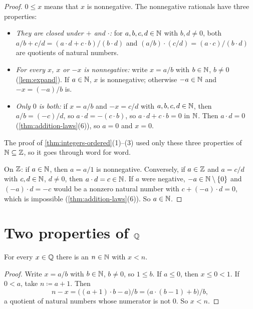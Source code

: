 \begin{proof}
$0 \le x$ means that $x$ is nonnegative. The nonnegative rationals have three
properties:
\begin{itemize}
  \item \emph{They are closed under $+$ and $\cdot$:} for $a, b, c, d \in \mathbb{N}$ with
    $b, d \neq 0$, both $a / b + c / d = (a \cdot d + c \cdot b) / (b \cdot d)$ and
    $(a / b) \cdot (c / d) = (a \cdot c) / (b \cdot d)$ are quotients of natural
    numbers.
  \item \emph{For every $x$, $x$ or $-x$ is nonnegative:} write $x = a / b$ with $b
    \in \mathbb{N}$, $b \neq 0$ (\cref{lem:expand}). If $a \in \mathbb{N}$, $x$ is nonnegative;
    otherwise $-a \in \mathbb{N}$ and $-x = (-a) / b$ is.
  \item \emph{Only $0$ is both:} if $x = a / b$ and $-x = c / d$ with $a, b, c, d
    \in \mathbb{N}$, then $a / b = (-c) / d$, so $a \cdot d = -(c \cdot b)$, so $a \cdot d
    + c \cdot b = 0$ in $\mathbb{N}$. Then $a \cdot d = 0$ (\cref{thm:addition-laws}(6)),
    so $a = 0$ and $x = 0$.
\end{itemize}
The proof of \cref{thm:integers-ordered}(1)--(3) used only these three properties
of $\mathbb{N} \subseteq \mathbb{Z}$, so it goes through word for word.

On $\mathbb{Z}$: if $a \in \mathbb{N}$, then $a = a / 1$ is nonnegative. Conversely, if $a \in \mathbb{Z}$
and $a = c / d$ with $c, d \in \mathbb{N}$, $d \neq 0$, then $a \cdot d = c \in \mathbb{N}$. If $a$
were negative, $-a \in \mathbb{N} \setminus \lbrace 0 \rbrace$ and $(-a) \cdot d = -c$ would be a
nonzero natural number with $c + (-a) \cdot d = 0$, which is impossible
(\cref{thm:addition-laws}(6)). So $a \in \mathbb{N}$.
\end{proof}

\section{Two properties of \texorpdfstring{$\mathbb{Q}$}{Q}}

\begin{theorem}
\label{thm:archimedean}
For every $x \in \mathbb{Q}$ there is an $n \in \mathbb{N}$ with $x < n$.
\end{theorem}

\begin{proof}
Write $x = a / b$ with $b \in \mathbb{N}$, $b \neq 0$, so $1 \le b$. If $a \le 0$, then $x
\le 0 < 1$. If $0 < a$, take $n \coloneqq a + 1$. Then
\[
  n - x = \bigl( (a + 1) \cdot b - a \bigr) / b = \bigl( a \cdot (b - 1) + b \bigr)
  / b,
\]
a quotient of natural numbers whose numerator is not $0$. So $x < n$.
\end{proof}

